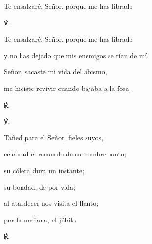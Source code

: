 			\begin{readtheme}Te ensalzaré, Señor, porque me has librado\end{readtheme}
			
			\begin{readbody}\begin{readred}℣.\end{readred} Te ensalzaré, Señor, porque me has librado \end{readbody}
			
			\begin{readtabbed}y no has dejado que mis enemigos se rían de mí. \end{readtabbed}
			
			\begin{readtabbed}Señor, sacaste mi vida del abismo, \end{readtabbed}
			
			\begin{readtabbed}me hiciste revivir cuando bajaba a la fosa. \begin{readred}℟.\end{readred}\end{readtabbed}
			
			\begin{readbody}\begin{readred}℣.\end{readred} Tañed para el Señor, fieles suyos, \end{readbody}
			
			\begin{readtabbed}celebrad el recuerdo de su nombre santo; \end{readtabbed}
			
			\begin{readtabbed}su cólera dura un instante; \end{readtabbed}
			
			\begin{readtabbed}su bondad, de por vida; \end{readtabbed}
			
			\begin{readtabbed}al atardecer nos visita el llanto; \end{readtabbed}
			
			\begin{readtabbed}por la mañana, el júbilo. \begin{readred}℟.\end{readred}\end{readtabbed}
			
